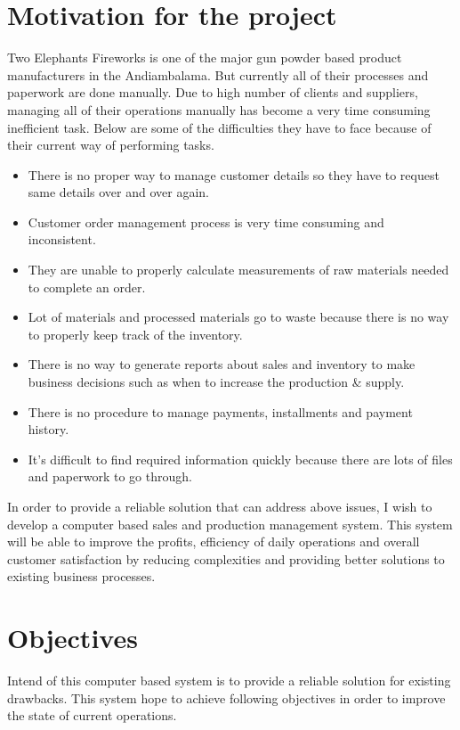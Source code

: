 \documentclass[12pt]{report}
\begin{document}
\section{Motivation for the project}
Two Elephants Fireworks is one of the major gun powder based product manufacturers in  the Andiambalama. But currently all of their processes and paperwork are done manually. Due to high number of clients and suppliers, managing all of their operations manually has become a very time consuming inefficient task. Below are some of the difficulties they have to face because of their current way of performing tasks.

\begin{itemize}
	\item There is no proper way to manage customer details so they have to request same details over and over again.
	\item Customer order management process is very time consuming and inconsistent.
	\item They are unable to properly calculate measurements of raw materials needed to complete an order.
	\item Lot of materials and processed materials go to waste because there is no way to properly keep track of the inventory.
	\item There is no way to generate reports about sales and inventory to make business decisions such as when to increase the production \& supply.
	\item There is no procedure to manage payments, installments and payment history.
	\item It’s difficult to find required information quickly because there are lots of files and paperwork to go through.
\end{itemize}

In order to provide a reliable solution that can address above issues, I wish to develop a computer based sales and production management system. This system will be able to improve the profits, efficiency of daily operations and overall customer satisfaction by reducing complexities and providing better solutions to existing business processes.

\section{Objectives}

Intend of this computer based system is to provide a reliable solution for existing drawbacks.  This system hope to achieve following objectives in order to improve the state of current operations.
\end{document}
